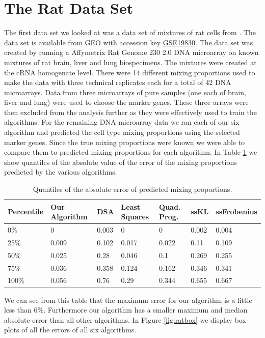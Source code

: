 \documentclass[reqno,12pt,oneside]{report}\usepackage[]{graphicx}\usepackage[]{color}
\theoremstyle{plain}
\theoremstyle{definition}
\theoremstyle{remark}
\numberwithin{theorem}{chapter}     %
\begin{document}
\section{The Rat Data Set}

The first data set we looked at was a data set of mixtures of rat cells from \cite{Shen-Orr2010}. The data set is available from GEO with accession key \href{https://www.ncbi.nlm.nih.gov/geo/query/acc.cgi?acc=GSE19830}{GSE19830}. The data set was created by running a Affymetrix Rat Genome 230 2.0 DNA microarray on known mixtures of rat brain, liver and lung biospecimens. The mixtures were created at the cRNA homogenate level. There were 14 different mixing proportions used to make the data with three technical replicates each for a total of 42 DNA microarrays. Data from three microarrays of pure samples (one each of brain, liver and lung) were used to choose the marker genes. These three arrays were then excluded from the analysis further as they were effectively used to train the algorithms. For the remaining DNA microarray data we ran each of our six algorithm and predicted the cell type mixing proportions using the selected marker genes. Since the true mixing proportions were known we were able to compare them to predicted mixing proportions for each algorithm. In Table \ref{tab:rat1} we show quantiles of the absolute value of the error of the mixing proportions predicted by the various algorithms.


\begin{table}[ht]
\centering
\begin{tabular}{lllllll}
  \hline
Percentile & Our Algorithm & DSA & Least Squares & Quad. Prog. & ssKL & ssFrobenius \\ 
  \hline
0\% & 0 & 0.003 & 0 & 0 & 0.002 & 0.004 \\ 
  25\% & 0.009 & 0.102 & 0.017 & 0.022 & 0.11 & 0.109 \\ 
  50\% & 0.025 & 0.28 & 0.046 & 0.1 & 0.269 & 0.255 \\ 
  75\% & 0.036 & 0.358 & 0.124 & 0.162 & 0.346 & 0.341 \\ 
  100\% & 0.056 & 0.76 & 0.29 & 0.344 & 0.655 & 0.667 \\ 
   \hline
\end{tabular}
\caption{Quantiles of the absolute error of predicted mixing proportions.} 
\label{tab:rat1}
\end{table}


We can see from this table that the maximum error for our algorithm is a little less than 6\%. Furthermore our algorithm has a smaller maximum and median absolute error than all other algorithms. In Figure \ref{fig:ratbox} we display box-plots of all the errors of all six algorithms. 
\end{document}
